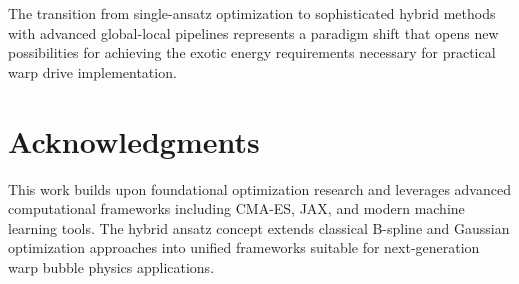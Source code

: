 \documentclass[11pt,a4paper]{article}
\begin{document}
The transition from single-ansatz optimization to sophisticated hybrid methods with advanced global-local pipelines represents a paradigm shift that opens new possibilities for achieving the exotic energy requirements necessary for practical warp drive implementation.

\section*{Acknowledgments}

This work builds upon foundational optimization research and leverages advanced computational frameworks including CMA-ES, JAX, and modern machine learning tools. The hybrid ansatz concept extends classical B-spline and Gaussian optimization approaches into unified frameworks suitable for next-generation warp bubble physics applications.
\end{document}
